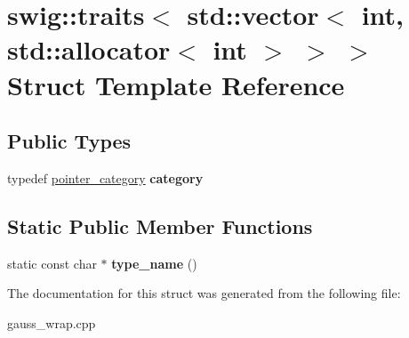 \hypertarget{structswig_1_1traits_3_01std_1_1vector_3_01int_00_01std_1_1allocator_3_01int_01_4_01_4_01_4}{\section{swig\-:\-:traits$<$ std\-:\-:vector$<$ int, std\-:\-:allocator$<$ int $>$ $>$ $>$ Struct Template Reference}
\label{structswig_1_1traits_3_01std_1_1vector_3_01int_00_01std_1_1allocator_3_01int_01_4_01_4_01_4}
}
\subsection*{Public Types}
\begin{DoxyCompactItemize}
\item 
\hypertarget{structswig_1_1traits_3_01std_1_1vector_3_01int_00_01std_1_1allocator_3_01int_01_4_01_4_01_4_a0a83375a568dee5041a73b5d77c9ffa3}{typedef \hyperlink{structswig_1_1pointer__category}{pointer\-\_\-category} {\bfseries category}}\label{structswig_1_1traits_3_01std_1_1vector_3_01int_00_01std_1_1allocator_3_01int_01_4_01_4_01_4_a0a83375a568dee5041a73b5d77c9ffa3}

\end{DoxyCompactItemize}
\subsection*{Static Public Member Functions}
\begin{DoxyCompactItemize}
\item 
\hypertarget{structswig_1_1traits_3_01std_1_1vector_3_01int_00_01std_1_1allocator_3_01int_01_4_01_4_01_4_a4c5f68cd1d12c59290b0c25d7a65b0af}{static const char $\ast$ {\bfseries type\-\_\-name} ()}\label{structswig_1_1traits_3_01std_1_1vector_3_01int_00_01std_1_1allocator_3_01int_01_4_01_4_01_4_a4c5f68cd1d12c59290b0c25d7a65b0af}

\end{DoxyCompactItemize}


The documentation for this struct was generated from the following file\-:\begin{DoxyCompactItemize}
\item 
gauss\-\_\-wrap.\-cpp\end{DoxyCompactItemize}

